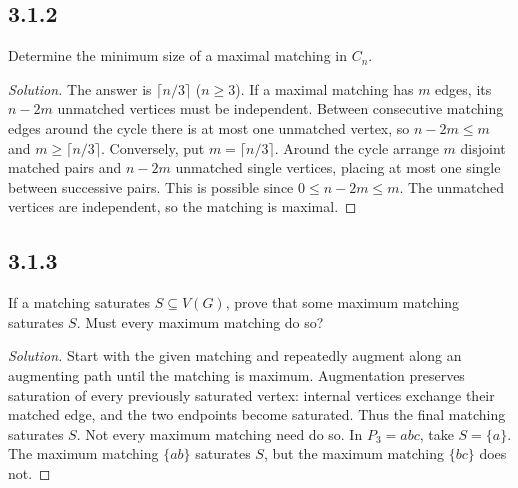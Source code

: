 \documentclass[12pt]{amsart}
\newenvironment{solution}{\begin{proof}[Solution]}{\end{proof}}
\begin{document}
    \subsection*{3.1.2} Determine the minimum size of a maximal matching in $C_n$.
    \begin{solution}The answer is $\lceil n/3\rceil$ ($n\ge3$). If a maximal matching has $m$ edges, its $n-2m$ unmatched vertices must be independent. Between consecutive matching edges around the cycle there is at most one unmatched vertex, so $n-2m\le m$ and $m\ge\lceil n/3\rceil$.
    Conversely, put $m=\lceil n/3\rceil$. Around the cycle arrange $m$ disjoint matched pairs and $n-2m$ unmatched single vertices, placing at most one single between successive pairs. This is possible since $0\le n-2m\le m$. The unmatched vertices are independent, so the matching is maximal.\end{solution}

    \subsection*{3.1.3} If a matching saturates $S\subseteq V(G)$, prove that some maximum matching saturates $S$. Must every maximum matching do so?
    \begin{solution}Start with the given matching and repeatedly augment along an augmenting path until the matching is maximum. Augmentation preserves saturation of every previously saturated vertex: internal vertices exchange their matched edge, and the two endpoints become saturated. Thus the final matching saturates $S$.
    Not every maximum matching need do so. In $P_3=a b c$, take $S=\{a\}$. The maximum matching $\{ab\}$ saturates $S$, but the maximum matching $\{bc\}$ does not.\end{solution}
\end{document}
